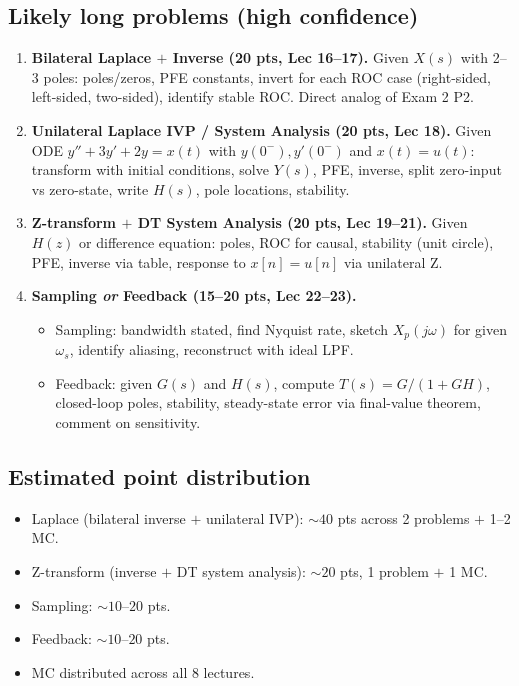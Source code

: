 \documentclass[11pt]{article}
\begin{document}
\subsection*{Likely long problems (high confidence)}
\begin{enumerate}[leftmargin=*]
    \item \textbf{Bilateral Laplace $+$ Inverse (20 pts, Lec 16--17).} Given $X(s)$ with 2--3 poles: poles/zeros, PFE constants, invert for each ROC case (right-sided, left-sided, two-sided), identify stable ROC. Direct analog of Exam 2 P2.
    \item \textbf{Unilateral Laplace IVP / System Analysis (20 pts, Lec 18).} Given ODE $y''+3y'+2y=x(t)$ with $y(0^-),y'(0^-)$ and $x(t)=u(t)$: transform with initial conditions, solve $Y(s)$, PFE, inverse, split zero-input vs zero-state, write $H(s)$, pole locations, stability.
    \item \textbf{Z-transform $+$ DT System Analysis (20 pts, Lec 19--21).} Given $H(z)$ or difference equation: poles, ROC for causal, stability (unit circle), PFE, inverse via table, response to $x[n]=u[n]$ via unilateral Z.
    \item \textbf{Sampling \emph{or} Feedback (15--20 pts, Lec 22--23).}
    \begin{itemize}
        \item Sampling: bandwidth stated, find Nyquist rate, sketch $X_p(j\omega)$ for given $\omega_s$, identify aliasing, reconstruct with ideal LPF.
        \item Feedback: given $G(s)$ and $H(s)$, compute $T(s)=G/(1+GH)$, closed-loop poles, stability, steady-state error via final-value theorem, comment on sensitivity.
    \end{itemize}
\end{enumerate}

\subsection*{Estimated point distribution}
\begin{itemize}[leftmargin=*]
    \item Laplace (bilateral inverse $+$ unilateral IVP): $\sim 40$ pts across 2 problems $+$ 1--2 MC.
    \item Z-transform (inverse $+$ DT system analysis): $\sim 20$ pts, 1 problem $+$ 1 MC.
    \item Sampling: $\sim 10$--$20$ pts.
    \item Feedback: $\sim 10$--$20$ pts.
    \item MC distributed across all 8 lectures.
\end{itemize}
\end{document}
